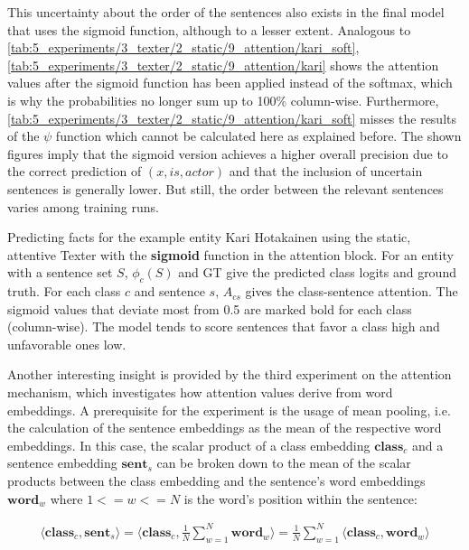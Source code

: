 This uncertainty about the order of the sentences also exists in the final model that uses the sigmoid function, although to a lesser extent. Analogous to \autoref{tab:5_experiments/3_texter/2_static/9_attention/kari_soft},  \autoref{tab:5_experiments/3_texter/2_static/9_attention/kari} shows the attention values after the sigmoid function has been applied instead of the softmax, which is why the probabilities no longer sum up to 100\% column-wise. Furthermore, \autoref{tab:5_experiments/3_texter/2_static/9_attention/kari_soft} misses the results of the $\psi$ function which cannot be calculated here as explained before. The shown figures imply that the sigmoid version achieves a higher overall precision due to the correct prediction of $(x, is, actor)$ and that the inclusion of uncertain sentences is generally lower. But still, the order between the relevant sentences varies among training runs.

\begin{table}[t]
    \makebox[\textwidth][c]{
        
    }
    \caption{Predicting facts for the example entity Kari Hotakainen using the static, attentive Texter with the \textbf{sigmoid} function in the attention block. For an entity with a sentence set $S$, $\phi_c(S)$ and GT give the predicted class logits and ground truth. For each class $c$ and sentence $s$, $A_{cs}$ gives the class-sentence attention. The sigmoid values that deviate most from 0.5 are marked bold for each class (column-wise). The model tends to score sentences that favor a class high and unfavorable ones low.}
    \label{tab:5_experiments/3_texter/2_static/9_attention/kari}
\end{table}

Another interesting insight is provided by the third experiment on the attention mechanism, which investigates how attention values derive from word embeddings. A prerequisite for the experiment is the usage of mean pooling, i.e. the calculation of the sentence embeddings as the mean of the respective word embeddings. In this case, the scalar product of a class embedding $\textbf{class}_c$ and a sentence embedding $\textbf{sent}_s$ can be broken down to the mean of the scalar products between the class embedding and the sentence's word embeddings $\textbf{word}_w$ where $1 <= w <= N$ is the word's position within the sentence:

\begin{align}
    \langle \textbf{class}_c, \textbf{sent}_s \rangle
    = \langle \textbf{class}_c, \frac{1}{N} \sum_{w=1}^N \textbf{word}_w \rangle
    = \frac{1}{N} \sum_{w=1}^N \langle \textbf{class}_c, \textbf{word}_w \rangle
    \label{eq:5_experiments/3_texter/2_static/9_attention/word_embs}
\end{align}

